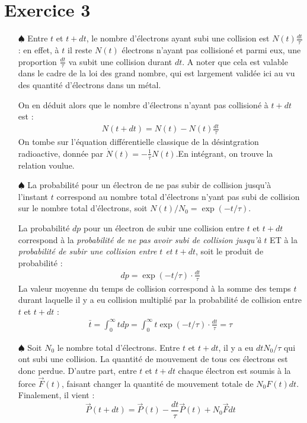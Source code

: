 \documentclass{report}
\begin{document}
\section*{Exercice 3}

\begin{itemize}
	
	\item[$\spadesuit$] Entre $t$ et $t+dt$, le nombre d'électrons ayant subi une collision est $N(t)\frac{dt}{\tau}$ : en effet, à $t$ il reste $N(t)$ électrons n'ayant pas collisioné et parmi eux, une proportion $\frac{dt}{\tau}$ va subit une collision durant $dt$. A noter que cela est valable dans le cadre de la loi des grand nombre, qui est largement validée ici au vu des quantité d'électrons dans un métal.
	
	On en déduit alors que le nombre d'électrons n'ayant pas collisioné à $t+dt$ est :
	\begin{align*}
		N(t+dt) = N(t) - N(t)\frac{dt}{\tau}
	\end{align*}
	On tombe sur l'équation différentielle classique de la désintgration radioactive, donnée par $\dot{N}(t)=-\frac{1}{\tau}N(t)$.En intégrant, on trouve la relation voulue.
	
	\item[$\spadesuit$] La probabilité pour un électron de ne pas subir de collision jusqu'à l'instant $t$ correspond au nombre total d'électrons n'yant pas subi de collision sur le nombre total d'électrons, soit $N(t)/N_0=\exp(-t/\tau)$. 
	
	La probabilité $dp$ pour un électron de subir une collision entre $t$ et $t+dt$ correspond à la \textit{probabilité de ne pas avoir subi de collision jusqu'à} $t$ ET à la \textit{probabilité de subir une collision entre $t$ et $t+dt$}, soit le produit de probabilité :
	\begin{align*}
		dp = \exp(-t/\tau)\cdot\frac{dt}{\tau}
	\end{align*}
La valeur moyenne du temps de collision correspond à la somme des temps $t$ durant laquelle il y a eu collision multiplié par la probabilité de collision entre $t$ et $t+dt$ :
	\begin{align*}
		\bar{t}=\int_0^{\infty}tdp=\int_0^{\infty} t\exp(-t/\tau)\cdot\frac{dt}{\tau}=\tau
	\end{align*}
	
	\item[$\spadesuit$] Soit $N_0$ le nombre total d'électrons. Entre $t$ et $t+dt$, il y a eu $dtN_0/\tau$ qui ont subi une collision. La quantité de mouvement de tous ces électrons est donc perdue. D'autre part, entre $t$ et $t+dt$ chaque électron est soumis à la force $\vec{F}(t)$, faisant changer la quantité de mouvement totale de $N_0F(t)dt$. Finalement, il vient :
	\begin{equation}
		\vec{P}(t+dt)=\vec{P}(t)-\frac{dt}{\tau}\vec{P}(t)+N_0\vec{F}dt
	\end{equation}
	

\end{itemize}
\end{document}
